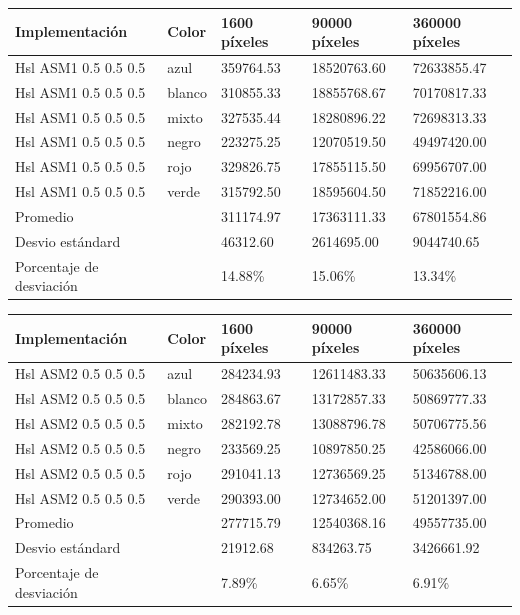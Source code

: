 \begin{tabular}{| l | l | l | l | l |}
\hline
Implementación & Color & 1600 píxeles & 90000 píxeles & 360000 píxeles\\
\hline
Hsl ASM1 0.5 0.5 0.5 & azul & 359764.53 & 18520763.60 & 72633855.47\\ 
\hline
Hsl ASM1 0.5 0.5 0.5 & blanco & 310855.33 & 18855768.67 & 70170817.33\\ 
\hline
Hsl ASM1 0.5 0.5 0.5 & mixto & 327535.44 & 18280896.22 & 72698313.33\\ 
\hline
Hsl ASM1 0.5 0.5 0.5 & negro & 223275.25 & 12070519.50 & 49497420.00\\
\hline
Hsl ASM1 0.5 0.5 0.5 & rojo & 329826.75 & 17855115.50 & 69956707.00\\
\hline
Hsl ASM1 0.5 0.5 0.5 & verde & 315792.50 & 18595604.50 & 71852216.00\\ 
\hline
Promedio & &  311174.97 & 17363111.33 & 67801554.86\\
\hline
Desvio estándard  && 46312.60 & 2614695.00  & 9044740.65\\
\hline
Porcentaje de desviación  && 14.88\% & 15.06\% & 13.34\%\\
\hline
\end{tabular}

\begin{tabular}{| l | l | l | l | l |}
\hline
Implementación & Color & 1600 píxeles & 90000 píxeles & 360000 píxeles\\
\hline
Hsl ASM2 0.5 0.5 0.5 & azul & 284234.93 & 12611483.33 & 50635606.13\\ 
\hline
Hsl ASM2 0.5 0.5 0.5 & blanco & 284863.67 & 13172857.33 & 50869777.33\\ 
\hline
Hsl ASM2 0.5 0.5 0.5 & mixto & 282192.78 & 13088796.78 & 50706775.56\\ 
\hline
Hsl ASM2 0.5 0.5 0.5 & negro & 233569.25 & 10897850.25 & 42586066.00\\
\hline
Hsl ASM2 0.5 0.5 0.5 & rojo & 291041.13 & 12736569.25 & 51346788.00\\
\hline
Hsl ASM2 0.5 0.5 0.5 & verde & 290393.00 & 12734652.00 & 51201397.00\\ 
\hline
Promedio & &  277715.79 & 12540368.16 & 49557735.00\\
\hline
Desvio estándard  &&  21912.68 & 834263.75 & 3426661.92\\
\hline
Porcentaje de desviación  &&  7.89\% &  6.65\% &  6.91\%\\
\hline
\end{tabular}

